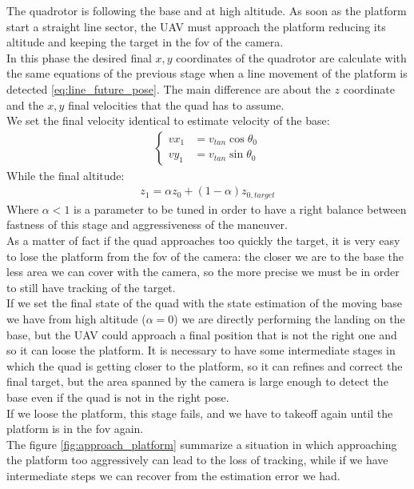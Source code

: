 The quadrotor is following the base and at high altitude. As soon as the platform start a straight line sector, the UAV must approach the platform reducing its altitude and keeping the target in the fov of the camera.\\
In this phase the desired final $x,y$ coordinates of the quadrotor are calculate with the same equations of the previous stage when a line movement of the platform is detected \ref{eq:line_future_pose}. 
The main difference are about the $z$ coordinate and the $x,y$ final velocities that the quad has to assume.\\
We set the final velocity identical to estimate velocity of the base:
\begin{align}
\begin{cases}
vx_1 &= v_{tan}\cos{\theta_0}\\[5pt]
vy_1 &= v_{tan}\sin{\theta_0}
\label{eq:finalstavelocity}
\end{cases}
\end{align}
While the final altitude:
\begin{align}
z_1 = \alpha z_0 + (1 - \alpha) z_{0,target}
\label{eq:finalz}
\end{align}
Where $\alpha <  1$ is a parameter to be tuned in order to have a right balance between fastness of this stage and aggressiveness of the maneuver.\\
As a matter of fact if the quad approaches too quickly the target, it is very easy to lose the platform from the fov of the camera: the closer we are to the base the less area we can cover with the camera, so the more precise we must be in order to still have tracking of the target.\\

If we set the final state of the quad with the state estimation of the moving base we have from high altitude ($\alpha = 0$) 
we are directly performing the landing on the base, but the UAV could approach a final position that is not the right one and so it can loose the platform. It is necessary to have some intermediate stages in which the quad is getting closer to the platform, so it can refines and correct the final target, but the area spanned by the camera is large enough to detect the base even if the quad is not in the right pose.\\
If we loose the platform, this stage fails, and we have to takeoff again until the platform is in the fov again.\\
The figure  \ref{fig:approach_platform} summarize a situation in which approaching the platform too aggressively can lead to the loss of tracking, while if we have intermediate steps we can recover from the estimation error we had.\\ 

